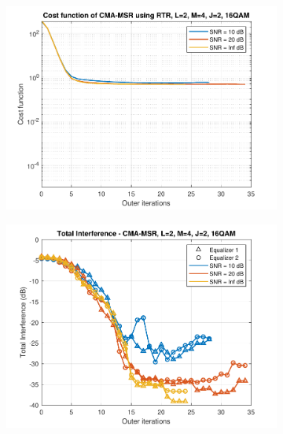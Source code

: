 \begin{figure}
\begin{subfigure}[b]{0.45\textwidth}
		\includegraphics[width=\linewidth]{./figs/BF_RTR_MSR_cost_16QAM_L=2_M=4_J=2_K=1000.pdf}
		\label{fig:rtr_msr_cost16}
	\end{subfigure}
	\begin{subfigure}[b]{0.45\textwidth}
		\includegraphics[width=\linewidth]{./figs/BF_RTR_MSR_TI_16QAM_L=2_M=4_J=2_K=1000.pdf}
		\label{fig:rtr_msr_ti16}
	\end{subfigure}
	\begin{subfigure}[b]{0.45\textwidth}

\end{subfigure}
\end{figure}
